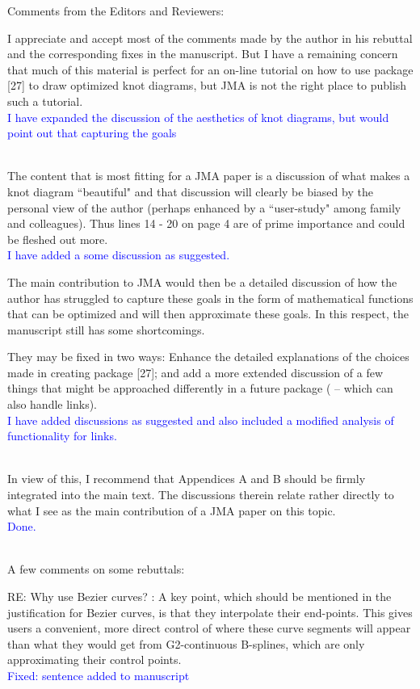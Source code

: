\documentclass[12pt]{article}
\begin{document}
Comments from the Editors and Reviewers:

I appreciate and accept most of the comments made by the author in his
rebuttal and the corresponding fixes in the manuscript.  But I have a
remaining concern that much of this material is perfect for an on-line
tutorial on how to use package [27] to draw optimized knot diagrams,
but JMA is not the right place to publish such a
tutorial.\textcolor{blue}{\\I have expanded the discussion of the
  aesthetics of knot diagrams, but would point out that capturing the
  goals\\ \\}

The content that is most fitting for a JMA paper is a discussion of
what makes a knot diagram ``beautiful" and that discussion will
clearly be biased by the personal view of the author (perhaps enhanced
by a ``user-study" among family and colleagues).  Thus lines 14 - 20
on page 4 are of prime importance and could be fleshed out more.
\textcolor{blue}{\\I have added a some discussion as suggested.}

The main contribution to JMA would then be a detailed discussion of
how the author has struggled to capture these goals in the form of
mathematical functions that can be optimized and will then approximate
these goals.  In this respect, the manuscript still has some
shortcomings.

They may be fixed in two ways: Enhance the detailed explanations of
the choices made in creating package [27]; and add a more extended
discussion of a few things that might be approached differently in a
future package ( -- which can also handle links).
\textcolor{blue}{\\I have added discussions as suggested and also
  included a modified analysis of functionality for links.\\ \\}

In view of this, I recommend that Appendices A and B should be firmly
integrated into the main text.  The discussions therein relate rather
directly to what I see as the main contribution of a JMA paper on this
topic.\textcolor{blue}{\\Done.\\ \\}

A few comments on some rebuttals:

RE: Why use Bezier curves? : A key point, which should be mentioned in
the justification for Bezier curves, is that they interpolate their
end-points. This gives users a convenient, more direct control of
where these curve segments will appear than what they would get from
G2-continuous B-splines, which are only approximating their control
points.\textcolor{blue}{\\Fixed: sentence added to manuscript\\ \\}
\end{document}
